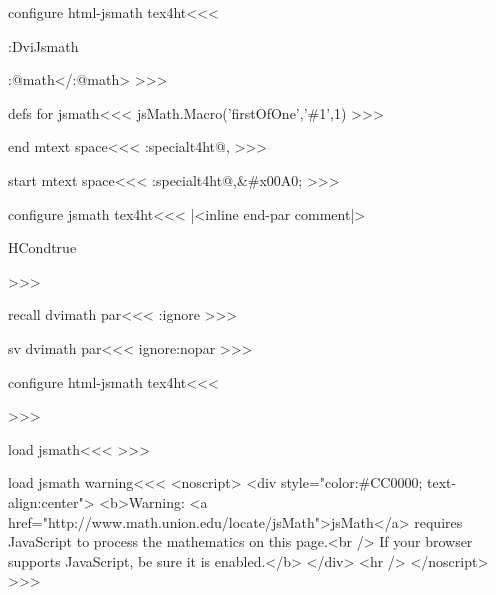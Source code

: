 \<configure html-jsmath tex4ht\><<<
    {\a:DviJsmath \mathltxtrue
       \ifOption{mml-fonts}{}{|%
       \IgnoreRule \HCode{<!--l.
                  \the\inputlineno-->}\ifx \a:@math\empty\else
               \Tg<\a:@math\space class="math"\Hnewline >\fi
       \a:math
       |<sv dvimath par|>\IgnorePar}
    {\ifx \a:@math\empty\else \Tg</\a:@math>\fi \EndIgnoreRule
     \ifOption{mml-fonts}{}{|%
     \mathltxfalse \After:Math \b:DviJsmath |<recall dvimath par|>}
>>>



\<defs for jsmath\><<<
jsMath.Macro('firstOfOne','\#1',1)
>>>



\<end mtext space\><<<
\ht:special{t4ht@,}%
>>>

\<start mtext space\><<<
\ht:special{t4ht@,&\#x00A0;}%
>>>




\<configure jsmath tex4ht\><<<
\Configure{$}
   {\DviMath}
   {\EndDviMath}{}
\Configure{$$} 
   {\IgnorePar
    |<inline end-par comment|>\EndP\DviMath}
   {\EndDviMath
       \ShowPar\par{\csname HCondtrue\endcsname\noindent}}
   {\DisplayMathtrue}
>>>

\<recall dvimath par\><<<
\sv:ignore
>>>

\<sv dvimath par\><<<
\edef\sv:ignore{\if:nopar  
    \noexpand\IgnorePar\else \noexpand\ShowPar\fi}%
>>>

\<configure html-jsmath tex4ht\><<<
   {\ifvmode \IgnorePar\fi \EndP{}\par\ShowPar}
>>>



\<load jsmath\><<<
>>>

\<load jsmath warning\><<<
<noscript> \Hnewline
<div style="color:\#CC0000; text-align:center"> \Hnewline
<b>Warning: <a href="http://www.math.union.edu/locate/jsMath">jsMath</a> \Hnewline
requires JavaScript to process the mathematics on this page.<br /> \Hnewline
If your browser supports JavaScript, be sure it is enabled.</b> \Hnewline
</div> \Hnewline
<hr /> \Hnewline
</noscript>\Hnewline
>>>
   


}}
